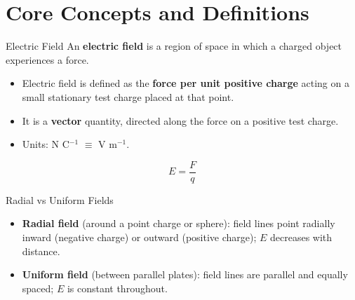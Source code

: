 

\section{Core Concepts and Definitions}

\begin{definitionbox}{Electric Field}
An \textbf{electric field} is a region of space in which a charged object experiences a force.
\begin{itemize}[itemsep=2pt]
  \item Electric field is defined as the \textbf{force per unit positive charge} acting on a small stationary test charge placed at that point.
  \item It is a \textbf{vector} quantity, directed along the force on a positive test charge.
  \item Units: N C$^{-1}$ $\equiv$ V m$^{-1}$.
\end{itemize}
$$E = \frac{F}{q}$$
\end{definitionbox}

\begin{definitionbox}{Radial vs Uniform Fields}
\begin{itemize}[itemsep=2pt]
  \item \textbf{Radial field} (around a point charge or sphere): field lines point radially inward (negative charge) or outward (positive charge); $E$ decreases with distance.
  \item \textbf{Uniform field} (between parallel plates): field lines are parallel and equally spaced; $E$ is constant throughout.
\end{itemize}
\end{definitionbox}

